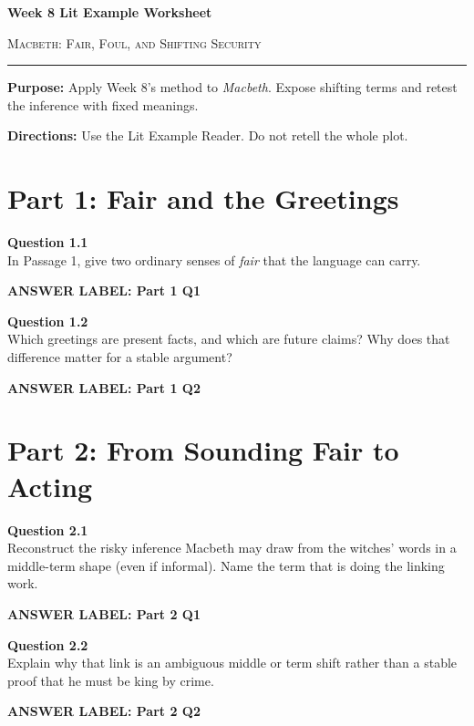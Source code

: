 \documentclass[12pt]{article}
\newcommand{\answerbox}[2]{%
\vspace{0.12em}
\noindent\textbf{#1}\par
\vspace{0.04em}
\noindent\fbox{%
\begin{minipage}[t][#2]{\dimexpr\textwidth-2\fboxsep-2\fboxrule}
\rule{\textwidth}{0pt}
\vspace{#2}
\end{minipage}}
\par\vspace{0.22em}}
\begin{document}
\begin{center}
{\LARGE\bfseries Week 8 Lit Example Worksheet}\par\vspace{0.05em}
{\large\scshape Macbeth: Fair, Foul, and Shifting Security}\par\vspace{0.12em}
\rule{0.78\textwidth}{0.5pt}
\end{center}

\textbf{Purpose:} Apply Week 8's method to \textit{Macbeth}. Expose shifting terms and retest the inference with fixed meanings.

\textbf{Directions:} Use the Lit Example Reader. Do not retell the whole plot.

\section*{Part 1: Fair and the Greetings}

\textbf{Question 1.1}\\[-0.15em]
In Passage 1, give two ordinary senses of \textit{fair} that the language can carry.

\answerbox{ANSWER LABEL: Part 1 Q1}{2.15in}

\textbf{Question 1.2}\\[-0.15em]
Which greetings are present facts, and which are future claims? Why does that difference matter for a stable argument?

\answerbox{ANSWER LABEL: Part 1 Q2}{2.35in}

\newpage

\section*{Part 2: From Sounding Fair to Acting}

\textbf{Question 2.1}\\[-0.15em]
Reconstruct the risky inference Macbeth may draw from the witches' words in a middle-term shape (even if informal). Name the term that is doing the linking work.

\answerbox{ANSWER LABEL: Part 2 Q1}{2.45in}

\textbf{Question 2.2}\\[-0.15em]
Explain why that link is an ambiguous middle or term shift rather than a stable proof that he must be king by crime.

\answerbox{ANSWER LABEL: Part 2 Q2}{2.35in}

\newpage
\end{document}
